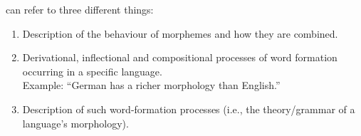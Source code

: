 \documentclass[a4paper,landscape,headrule,footrule]{foils}
\begin{document}
   can refer to three different things:
  \begin{enumerate}
    \item Description of the behaviour of morphemes and how they are combined.
    \item Derivational, inflectional and compositional processes of word formation occurring in a specific language.\\
          Example: ``German has a richer morphology than English.''
    \item Description of such word-formation processes (i.e., the theory/grammar of a language’s morphology).
    \end{enumerate}




\end{document}
